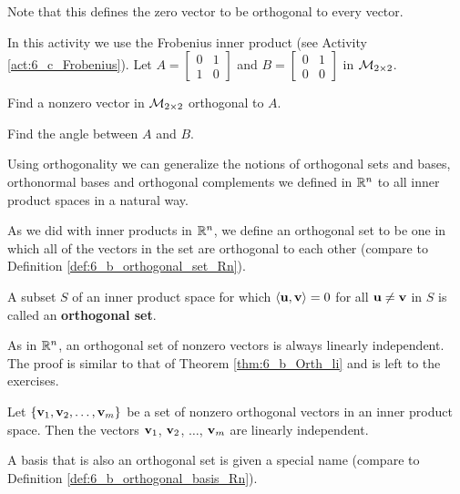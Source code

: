 Note that this defines the zero vector to be orthogonal to every vector.

\begin{activity} In this activity we use the Frobenius inner product (see Activity \ref{act:6_c_Frobenius}). Let $A = \left[ \begin{array}{cc} 0&1\\1&0 \end{array} \right]$ and $B = \left[ \begin{array}{cc} 0&1\\0&0 \end{array} \right]$ in $\mathcal{M}_{2 \times 2}$.
	\ba
	\item Find a nonzero vector in $\mathcal{M}_{2 \times 2}$ orthogonal to $A$.
	
	
	\item Find the angle between $A$ and $B$. 

	\ea
\end{activity}

Using orthogonality we can generalize the notions of orthogonal sets and bases, orthonormal bases and orthogonal complements we defined in $\mathbb{R}^n$ to all inner product spaces in a natural way.


As we did with inner products in $\mathbb{R}^n$, we define an orthogonal set to be one in which all of the vectors in the set are orthogonal to each other  (compare to Definition \ref{def:6_b_orthogonal_set_Rn}).

\begin{definition} A subset $S$ of an inner product space for which $\langle \mathbf{u}, \mathbf{v} \rangle = 0$ for all $\mathbf{u} \neq \mathbf{v}$ in $S$ is called an \textbf{orthogonal set}. 
\end{definition}

As in $\mathbb{R}^n$, an orthogonal set of nonzero vectors is always linearly independent. The proof is similar to that of Theorem  \ref{thm:6_b_Orth_li} and is left to the exercises. 

\begin{theorem} \label{thm:6_c_Orth_li_ips} Let $\{\mathbf{v}_1, \mathbf{v}_2, \ldots, \mathbf{v}_m\}$ be a set of nonzero orthogonal vectors in an inner product space. Then the vectors $\mathbf{v}_1$, $\mathbf{v}_2$, $\ldots$, $\mathbf{v}_m$ are linearly independent.
\end{theorem}


A basis that is also an orthogonal set is given a special name (compare to Definition \ref{def:6_b_orthogonal_basis_Rn}).

